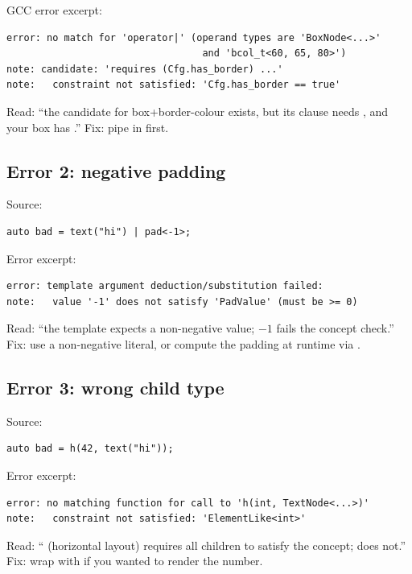 GCC error excerpt:

\begin{lstlisting}
error: no match for 'operator|' (operand types are 'BoxNode<...>'
                                  and 'bcol_t<60, 65, 80>')
note: candidate: 'requires (Cfg.has_border) ...'
note:   constraint not satisfied: 'Cfg.has_border == true'
\end{lstlisting}

Read: ``the candidate  for box+border-colour
exists, but its  clause needs
, and your box has
.'' Fix: pipe  in
first.

\subsection*{Error 2: negative padding}

Source:

\begin{lstlisting}
auto bad = text("hi") | pad<-1>;
\end{lstlisting}

Error excerpt:

\begin{lstlisting}
error: template argument deduction/substitution failed:
note:   value '-1' does not satisfy 'PadValue' (must be >= 0)
\end{lstlisting}

Read: ``the  template expects a non-negative value;
$-1$ fails the concept check.'' Fix: use a non-negative literal,
or compute the padding at runtime via .

\subsection*{Error 3: wrong child type}

Source:

\begin{lstlisting}
auto bad = h(42, text("hi"));
\end{lstlisting}

Error excerpt:

\begin{lstlisting}
error: no matching function for call to 'h(int, TextNode<...>)'
note:   constraint not satisfied: 'ElementLike<int>'
\end{lstlisting}

Read: `` (horizontal layout) requires all children to
satisfy the  concept;  does not.''
Fix: wrap with  if you wanted to
render the number.

